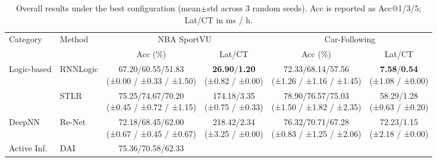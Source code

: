 \documentclass{article} %
\newcommand{\revise}[1]{#1}
\begin{document}
\begin{table}[t]
\centering
\footnotesize
\setlength{\tabcolsep}{1.5pt}
\renewcommand{\arraystretch}{1.08}
\caption{Overall results under the best configuration (mean$\pm$std across 3 random seeds). 
Acc is reported as Acc@1/3/5; Lat/CT in ms / h.}
\vspace{-2mm}
\label{tab:overall_compact_all}
\begin{tabular}{l l c c c c}
\toprule
\multirow{2}{*}{Category} & \multirow{2}{*}{Method}
& \multicolumn{2}{c}{NBA SportVU} & \multicolumn{2}{c}{Car-Following} \\
\cmidrule(lr){3-4} \cmidrule(lr){5-6}
& & Acc (\%) & Lat/CT & Acc (\%) & Lat/CT \\
\midrule
\multirow{2}{*}{Logic-based}
& RNNLogic & \makecell[c]{67.20/60.55/51.83\\[-3pt]
\revise{{\scriptsize (±0.00 / ±0.33 / ±1.50)}}} & \makecell[c]{\textbf{26.90}/\textbf{1.20}\\[-3pt]
\revise{{\scriptsize (±0.82 / ±0.00)}}} & \makecell[c]{72.33/68.14/57.56\\[-3pt]
\revise{{\scriptsize (±1.26 / ±1.16 / ±1.45)}}} & \makecell[c]{\textbf{7.58}/\textbf{0.54}\\[-3pt]
\revise{{\scriptsize (±1.08 / ±0.00)}}} \\
& STLR     & \makecell[c]{75.25/74.67/70.20\\[-3pt]
\revise{{\scriptsize (±0.45 / ±0.72 / ±1.15)}}} & \makecell[c]{174.18/3.35\\[-3pt]
\revise{{\scriptsize (±0.75 / ±0.33)}}} & \makecell[c]{78.90/76.57/75.03\\[-3pt]
\revise{{\scriptsize (±1.50 / ±1.82 / ±2.35)}}} & \makecell[c]{58.29/1.28\\[-3pt]
\revise{{\scriptsize (±0.63 / ±0.20)}}} \\
DeepNN & Re-Net & \makecell[c]{72.18/68.45/62.00\\[-3pt]
\revise{{\scriptsize (±0.67 / ±0.45 / ±0.67)}}} & \makecell[c]{218.42/2.34\\[-3pt]
\revise{{\scriptsize (±3.25 / ±0.00)}}} & \makecell[c]{76.32/70.71/67.28\\[-3pt]
\revise{{\scriptsize (±0.83 / ±1.25 / ±2.06)}}} & \makecell[c]{72.23/1.15\\[-3pt]
\revise{{\scriptsize (±2.18 / ±0.00)}}} \\
\multirow{2}{*}{Active Inf.}
& DAI      & \makecell[c]{75.36/70.58/62.33\\[-3pt]
}
\end{tabular}
\end{table}
\end{document}
